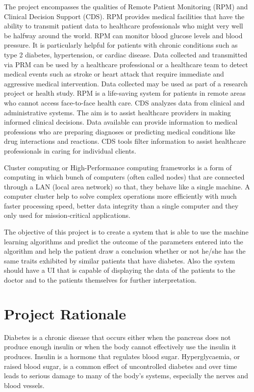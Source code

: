 \documentclass[12pt]{article}
\begin{document}
The project encompasses the qualities of Remote Patient Monitoring (RPM) and Clinical Decision Support (CDS). RPM provides medical facilities that have the ability to transmit patient data to healthcare professionals who might very well be halfway around the world. RPM can monitor blood glucose levels and blood pressure. It is particularly helpful for patients with chronic conditions such as type 2 diabetes, hypertension, or cardiac disease. Data collected and transmitted via PRM can be used by a healthcare professional or a healthcare team to detect medical events such as stroke or heart attack that require immediate and aggressive medical intervention. Data collected may be used as part of a research project or health study. RPM is a life-saving system for patients in remote areas who cannot access face-to-face health care. CDS analyzes data from clinical and administrative systems. The aim is to assist healthcare providers in making informed clinical decisions. Data available can provide information to medical professions who are preparing diagnoses or predicting medical conditions like drug interactions and reactions. CDS tools filter information to assist healthcare professionals in caring for individual clients. 

Cluster computing or High-Performance computing frameworks is a form of computing in which bunch of computers (often called nodes) that are connected through a LAN (local area network) so that, they behave like a single machine. A computer cluster help to solve complex operations more efficiently with much faster processing speed, better data integrity than a single computer and they only used for mission-critical applications.

The objective of this project is to create a  system that is able to use the machine learning algorithms and predict the outcome of the parameters entered into the algorithm and help the patient draw a conclusion whether or not he/she has the same traits exhibited by similar patients that have diabetes. Also the system should have a UI that is capable of displaying the data of the patients to the doctor and to the patients themselves for further interpretation.

\newpage
\section{Project Rationale}

Diabetes is a chronic disease that occurs either when the pancreas does not produce enough insulin or when the body cannot effectively use the insulin it produces. Insulin is a hormone that regulates blood sugar. Hyperglycaemia, or raised blood sugar, is a common effect of uncontrolled diabetes and over time leads to serious damage to many of the body's systems, especially the nerves and blood vessels.
\end{document}
